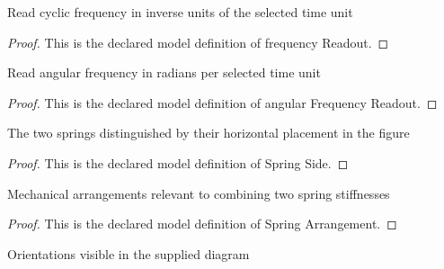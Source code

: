 \begin{definition}
  \label{def:physics:phyx-mini-0203:phyxminiproblems-problemphyxmini0203-frequencyreadout}
  Read cyclic frequency in inverse units of the selected time unit
\end{definition}
\begin{proof}
  This is the declared model definition of frequency Readout.
\end{proof}
\begin{definition}
  \label{def:physics:phyx-mini-0203:phyxminiproblems-problemphyxmini0203-angularfrequencyreadout}
  Read angular frequency in radians per selected time unit
\end{definition}
\begin{proof}
  This is the declared model definition of angular Frequency Readout.
\end{proof}
\begin{definition}
  \label{def:physics:phyx-mini-0203:phyxminiproblems-problemphyxmini0203-springside}
  The two springs distinguished by their horizontal placement in the figure
\end{definition}
\begin{proof}
  This is the declared model definition of Spring Side.
\end{proof}
\begin{definition}
  \label{def:physics:phyx-mini-0203:phyxminiproblems-problemphyxmini0203-springarrangement}
  Mechanical arrangements relevant to combining two spring stiffnesses
\end{definition}
\begin{proof}
  This is the declared model definition of Spring Arrangement.
\end{proof}
\begin{definition}[Orientation]
  \label{def:physics:phyx-mini-0203:phyxminiproblems-problemphyxmini0203-orientation}
  Orientations visible in the supplied diagram
\end{definition}
